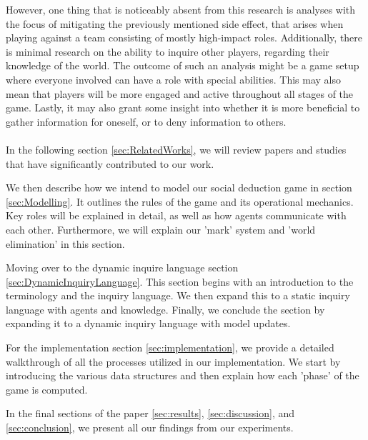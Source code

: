 However, one thing that is noticeably absent from this research is analyses
with the focus of mitigating the previously mentioned side effect, that arises
when playing against a team consisting of mostly high-impact roles.
Additionally, there is minimal research on the ability to inquire other
players, regarding their knowledge of the world. The outcome of such an
analysis might be a game setup where everyone involved can have a role with
special abilities. This may also mean that players will be more engaged and
active throughout all stages of the game. Lastly, it may also grant some
insight into whether it is more beneficial to gather information for oneself,
or to deny information to others.\\ \\

In the following section \ref{sec:RelatedWorks}, we will review papers and
studies that have significantly contributed to our work.

We then describe how we intend to model our social deduction game in section
\ref{sec:Modelling}. It outlines the rules of the game and its operational
mechanics. Key roles will be explained in detail, as well as how agents
communicate with each other. Furthermore, we will explain our 'mark' system and
'world elimination' in this section.

Moving over to the dynamic inquire language section
\ref{sec:DynamicInquiryLanguage}. This section begins with an introduction to
the terminology and the inquiry language. We then expand this to a static
inquiry language with agents and knowledge. Finally, we conclude the section by
expanding it to a dynamic inquiry language with model updates.

For the implementation section \ref{sec:implementation}, we provide a detailed
walkthrough of all the processes utilized in our implementation. We start by
introducing the various data structures and then explain how each 'phase' of
the game is computed. 

In the final sections of the paper \ref{sec:results}, \ref{sec:discussion}, and
\ref{sec:conclusion}, we present all our findings from our experiments.